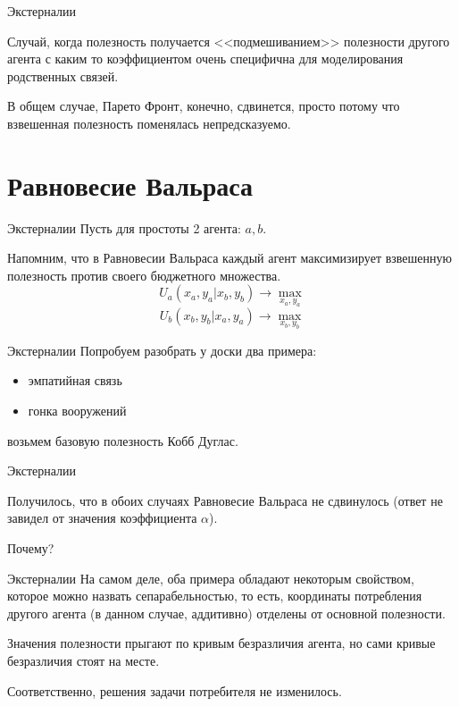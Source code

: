 \documentclass{beamer}
\begin{document}
\begin{frame}{Экстерналии}

Случай, когда полезность получается <<подмешиванием>> полезности другого агента с каким то коэффициентом очень специфична для моделирования родственных связей. 

В общем случае, Парето Фронт, конечно, сдвинется, просто потому что взвешенная полезность поменялась непредсказуемо.

\end{frame}


\section{Равновесие Вальраса}

\begin{frame}{Экстерналии}
Пусть для простоты 2 агента: $a,b$. 

Напомним, что в Равновесии Вальраса каждый агент максимизирует взвешенную полезность против своего бюджетного множества.
$$U_a(x_a, y_a|x_b, y_b) \to \max_{x_a, y_a}$$
$$U_b(x_b, y_b|x_a, y_a) \to \max_{x_b, y_b}$$
\end{frame}

\begin{frame}{Экстерналии}
Попробуем разобрать у доски два примера:
\begin{itemize}
  \item эмпатийная связь
  \item гонка вооружений
\end{itemize}
возьмем базовую полезность Кобб Дуглас.
\end{frame}

\begin{frame}{Экстерналии}

Получилось, что в обоих случаях Равновесие Вальраса не сдвинулось (ответ не завидел от значения коэффициента $\alpha$).

Почему?

\end{frame}

\begin{frame}{Экстерналии}
На самом деле, оба примера обладают некоторым свойством, которое можно назвать  \alert{сепарабельностью}, то есть, координаты потребления другого агента (в данном случае, аддитивно) отделены от основной полезности. 

Значения полезности прыгают по кривым безразличия агента, но сами кривые безразличия стоят на месте. 

Соответственно, решения задачи потребителя не изменилось.
\end{frame}
\end{document}
